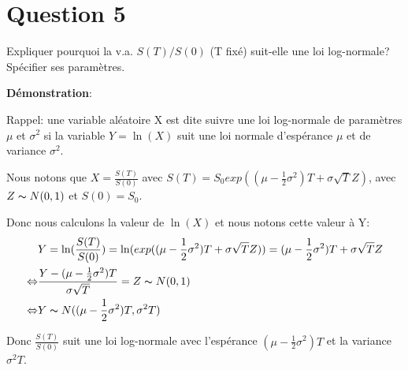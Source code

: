 \documentclass[a4paper,10pt]{report}
\begin{document}
\section{Question 5}
\par \noindent Expliquer pourquoi la v.a. $S(T)/S(0)$ (T fixé) suit-elle une loi log-normale? Spécifier ses paramètres.

\noindent \textbf{Démonstration}:
\par \noindent Rappel: une variable aléatoire X est dite suivre une loi log-normale de paramètres $\mu$ et $\sigma^{2}$ si la variable $Y = \ln(X)$ suit une loi normale d'espérance $\mu$ et de variance $\sigma^{2}$.
\par \noindent Nous notons que $X = \frac{S(T)}{S(0)}$ avec $S(T) = S_{0} exp((\mu - \frac{1}{2} \sigma^{2})T + \sigma \sqrt{T} Z)$, avec $Z \thicksim N(0,1)$ et $S(0) = S_{0}$.
\par Donc nous calculons la valeur de $\ln(X)$ et nous notons cette valeur à Y:
\begin{align*}
	&Y = \ln(\frac{S(T)}{S(0)}) = \ln(exp((\mu - \frac{1}{2} \sigma^{2})T + \sigma \sqrt{T} Z)) = (\mu - \frac{1}{2} \sigma^{2})T + \sigma \sqrt{T} Z \\
	\Leftrightarrow &\frac{Y - (\mu - \frac{1}{2} \sigma^{2})T}{\sigma \sqrt{T}} = Z \thicksim N(0,1) \\
	\Leftrightarrow & Y \thicksim N((\mu - \frac{1}{2} \sigma^{2})T, \sigma^{2} T)
\end{align*}
\par Donc $\frac{S(T)}{S(0)}$ suit une loi log-normale avec l'espérance $(\mu - \frac{1}{2} \sigma^{2})T$ et la variance $\sigma^{2} T$.
\end{document}
